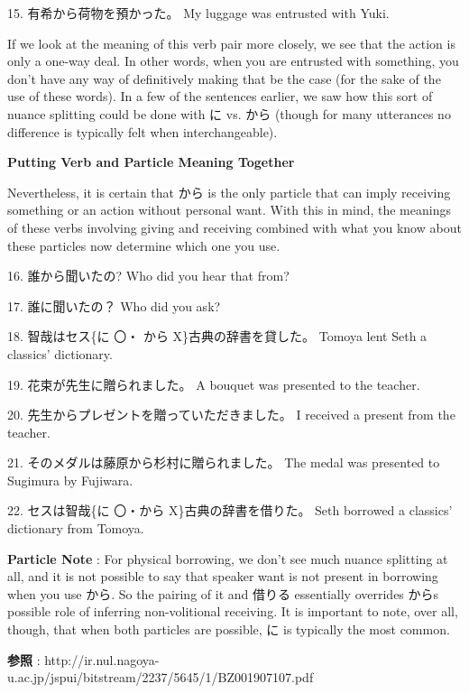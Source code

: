\par{15. 有希から荷物を預かった。 \hfill\break
My luggage was entrusted with Yuki. }

\par{ If we look at the meaning of this verb pair more closely, we see that the action is only a one-way deal. In other words, when you are entrusted with something, you don't have any way of definitively making that be the case (for the sake of the use of these words). In a few of the sentences earlier, we saw how this sort of nuance splitting could be done with に vs. から (though for many utterances no difference is typically felt when interchangeable). }

\begin{center}
\textbf{Putting Verb and Particle Meaning Together }
\end{center}

\par{ Nevertheless, it is certain that から is the only particle that can imply receiving something or an action without personal want. With this in mind, the meanings of these verbs involving giving and receiving combined with what you know about these particles now determine which one you use.  }

\par{16. 誰から聞いたの? \hfill\break
Who did you hear that from? }

\par{17. 誰に聞いたの？ \hfill\break
Who did you ask? }

\par{18. 智哉はセス\{に 〇・ から X\}古典の辞書を貸した。 \hfill\break
Tomoya lent Seth a classics' dictionary. }

\par{19. 花束が先生に贈られました。 \hfill\break
A bouquet was presented to the teacher. }

\par{20. 先生からプレゼントを贈っていただきました。 \hfill\break
I received a present from the teacher. }

\par{21. そのメダルは藤原から杉村に贈られました。 \hfill\break
The medal was presented to Sugimura by Fujiwara. }

\par{22. セスは智哉\{に 〇・から X\}古典の辞書を借りた。 \hfill\break
Seth borrowed a classics' dictionary from Tomoya.  }

\par{\textbf{Particle Note }: For physical borrowing, we don't see much nuance splitting at all, and it is not possible to say that speaker want is not present in borrowing when you use から. So the pairing of it and 借りる essentially overrides から\textquotesingle s possible role of inferring non-volitional receiving. It is important to note, over all, though, that when both particles are possible, に is typically the most common. }

\par{\textbf{参照 }: http:\slash \slash ir.nul.nagoya-u.ac.jp\slash jspui\slash bitstream\slash 2237\slash 5645\slash 1\slash BZ001907107.pdf }
    
